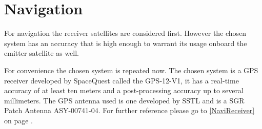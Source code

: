\section{Navigation}
\label{NaviEmitter}

For navigation the receiver satellites are considered first. However the chosen system has an accuracy that is high enough to warrant its usage onboard the emitter satellite as well.

For convenience the chosen system is repeated now. The chosen system is a \acs{GPS} receiver developed by SpaceQuest called the GPS-12-V1, it has a real-time accuracy of at least ten meters and a post-processing accuracy up to several millimeters. The \acs{GPS} antenna used is one developed by \ac{SSTL} and is a SGR Patch Antenna ASY-00741-04. For further reference please go to \ref{NaviReceiver} on page \pageref{NaviReceiver}.
